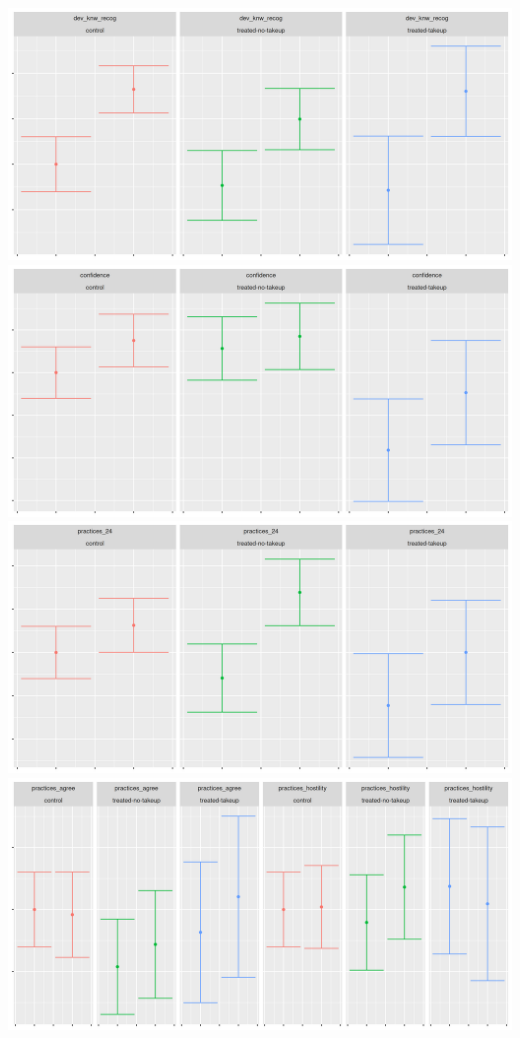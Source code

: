 \documentclass{article}
\begin{document}
\includegraphics[width=\textwidth]{plots/pre_post/health_knw.png}
\includegraphics[width=\textwidth]{plots/pre_post/confidence.png}
\includegraphics[width=\textwidth]{plots/pre_post/was_breastfed.png}
\includegraphics[width=\textwidth]{plots/pre_post/practices_agree.png}
\end{document}

